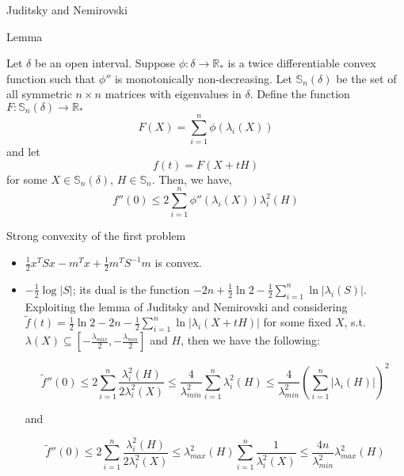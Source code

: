 \documentclass[10pt]{beamer}
\begin{document}
\begin{frame}{Juditsky and Nemirovski}

\begin{block}{Lemma}

Let $\delta$ be an
open interval. Suppose $\phi : \delta \rightarrow \mathbb{R}_*$
is a twice differentiable convex function such that $\phi''$
is monotonically non-decreasing. Let $\mathbb{S}_n(\delta)$ be the set of all symmetric $n \times n$
matrices with eigenvalues in $\delta$. Define the function $F : \mathbb{S}_n(\delta) → \mathbb{R}_*$
\[
F(X) = \sum^n_{i=1} \phi (\lambda_i(X))
\]
and let
\[
f(t) = F(X + tH)
\]
for some $X \in \mathbb{S}_n (\delta)$, $H \in \mathbb{S}_n$. Then, we have,
\[
f''(0) \leq 2 \sum^n_{i=1} \phi'' (\lambda_i(X))\lambda_i^2(H)
\]
\end{block}

\end{frame}


\begin{frame}{Strong convexity of the first problem}
\begin{itemize}
 
\item $\frac12 x^TSx - m^Tx + \frac12 m^T S^{-1}m$ is convex.

\item $-\frac12 \log |S|$; its dual is the function $-2n + \frac 12 \ln 2 - \frac 12 \sum_{i=1}^n \ln|\lambda_i(S)|$.
\\

Exploiting the lemma of Juditsky and Nemirovski and considering $\tilde f(t) = \frac 12 \ln 2 - 2n - \frac 12 \sum_{i=1}^n \ln |\lambda_i(X+tH)|$ for some fixed $X$, s.t. $\lambda(X) \subseteq[-\frac{\lambda_{max}}2, -\frac{\lambda_{min}}2]$ and $H$, then we have the following:

\[
\tilde f''(0) \leq 2\sum_{i=1}^n \frac{\lambda_i^2(H)}{2\lambda_i^2(X)} \leq \frac 4{\lambda_{min}^2}\sum_{i=1}^n \lambda_i^2(H) \leq \frac 4{\lambda_{min}^2}\left( \sum_{i=1}^n |\lambda_i(H)|\right)^2 %
\]

and

\[
\tilde f''(0) \leq 2\sum_{i=1}^n \frac{\lambda_i^2(H)}{2\lambda_i^2(X)} \leq \lambda_{max}^2(H) \sum_{i=1}^n \frac{1}{\lambda_i^2(X)} \leq \frac{4n}{\lambda_{min}^2} \lambda_{max}^2(H) 
\]

\end{itemize}

    
\end{frame}
\end{document}
